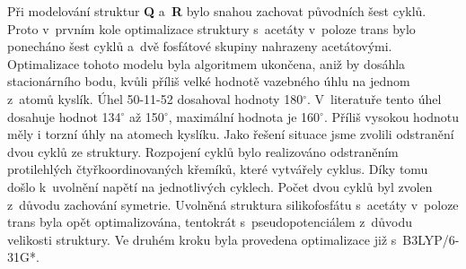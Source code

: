 \documentclass[
digital, %
table,   %
nolof,     %
nolot,     %
oneside,
]{fithesis3}
\begin{document}
Při modelování struktur \textbf{Q} a~\textbf{R} bylo snahou zachovat původních šest cyklů. Proto v~prvním kole optimalizace struktury s~acetáty v~poloze trans bylo ponecháno šest cyklů a~dvě fosfátové skupiny nahrazeny acetátovými. Optimalizace tohoto modelu byla algoritmem ukončena, aniž by dosáhla stacionárního bodu, kvůli příliš velké hodnotě vazebného úhlu na jednom z~atomů kyslík. Úhel 50-11-52 dosahoval hodnoty 180$^\circ$. V~literatuře tento úhel dosahuje hodnot 134$^\circ$ až 150$^\circ$, maximální hodnota je 160$^\circ$\cite{yuan2003si}. Příliš vysokou hodnotu měly i torzní úhly na atomech kyslíku. Jako řešení situace jsme zvolili odstranění dvou cyklů ze struktury. Rozpojení cyklů bylo realizováno odstraněním protilehlých čtyřkoordinovaných křemíků, které vytvářely cyklus. Díky tomu došlo k~uvolnění napětí na jednotlivých cyklech. Počet dvou cyklů byl zvolen z~důvodu zachování symetrie. Uvolněná struktura silikofosfátu s~acetáty v~poloze trans byla opět optimalizována, tentokrát s~pseudopotenciálem z~důvodu velikosti struktury. Ve druhém kroku byla provedena optimalizace již s~B3LYP/6-31G*.\\
\end{document}
